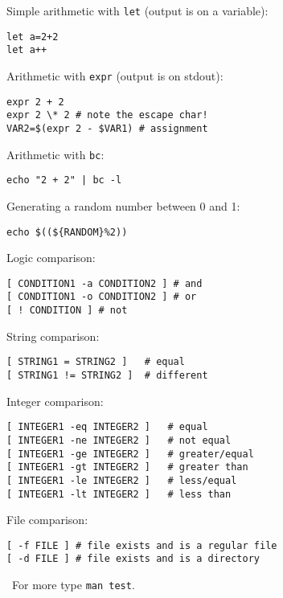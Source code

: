 \documentclass[twocolumn,8pt]{article}
\begin{document}
\begin{mdframed}[frametitle=Arithmetic]
Simple arithmetic with \texttt{let} (output is on a variable):
\begin{lstlisting}
let a=2+2
let a++
\end{lstlisting}

Arithmetic with \texttt{expr} (output is on stdout):
\begin{lstlisting}
expr 2 + 2
expr 2 \* 2 # note the escape char!
VAR2=$(expr 2 - $VAR1) # assignment
\end{lstlisting}

Arithmetic with \texttt{bc}:
\begin{lstlisting}
echo "2 + 2" | bc -l
\end{lstlisting}

Generating a random number between 0 and 1:
\begin{lstlisting}
echo $((${RANDOM}%2))
\end{lstlisting}

\end{mdframed}


\begin{mdframed}[frametitle=Test command for conditions]

Logic comparison:
\begin{lstlisting}
[ CONDITION1 -a CONDITION2 ] # and
[ CONDITION1 -o CONDITION2 ] # or
[ ! CONDITION ] # not
\end{lstlisting}

String comparison:
\begin{lstlisting}
[ STRING1 = STRING2 ]   # equal
[ STRING1 != STRING2 ]  # different
\end{lstlisting}

Integer comparison:
\begin{lstlisting}
[ INTEGER1 -eq INTEGER2 ]   # equal
[ INTEGER1 -ne INTEGER2 ]   # not equal
[ INTEGER1 -ge INTEGER2 ]   # greater/equal
[ INTEGER1 -gt INTEGER2 ]   # greater than
[ INTEGER1 -le INTEGER2 ]   # less/equal
[ INTEGER1 -lt INTEGER2 ]   # less than
\end{lstlisting}

File comparison:
\begin{lstlisting}
[ -f FILE ] # file exists and is a regular file
[ -d FILE ] # file exists and is a directory
\end{lstlisting}

\faInfoCircle\ For more type \texttt{man test}.

\vspace{3pt}
\end{mdframed}
\end{document}
